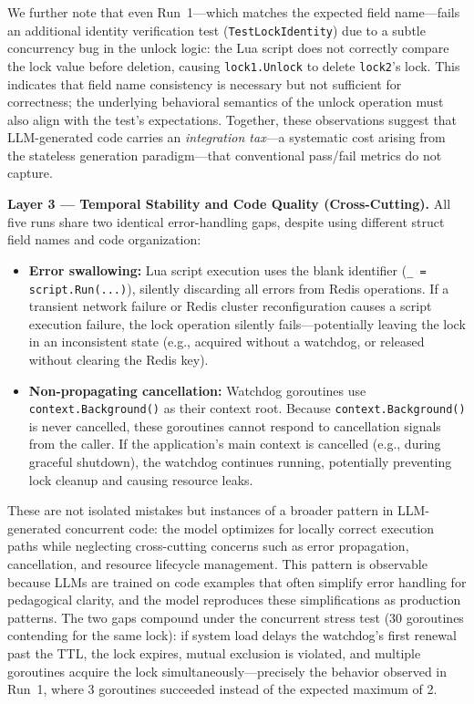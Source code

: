 \documentclass[conference]{IEEEtran}
\begin{document}
We further note that even Run~1---which matches the expected field name---fails an additional identity verification test (\texttt{TestLockIdentity}) due to a subtle concurrency bug in the unlock logic: the Lua script does not correctly compare the lock value before deletion, causing \texttt{lock1.Unlock} to delete \texttt{lock2}'s lock. This indicates that field name consistency is necessary but not sufficient for correctness; the underlying behavioral semantics of the unlock operation must also align with the test's expectations. Together, these observations suggest that LLM-generated code carries an \emph{integration tax}---a systematic cost arising from the stateless generation paradigm---that conventional pass/fail metrics do not capture.

\textbf{Layer 3 --- Temporal Stability and Code Quality (Cross-Cutting).}
All five runs share two identical error-handling gaps, despite using different struct field names and code organization:

\begin{itemize}
  \item \textbf{Error swallowing:} Lua script execution uses the blank identifier (\texttt{\_ = script.Run(...)}), silently discarding all errors from Redis operations. If a transient network failure or Redis cluster reconfiguration causes a script execution failure, the lock operation silently fails---potentially leaving the lock in an inconsistent state (e.g., acquired without a watchdog, or released without clearing the Redis key).
  \item \textbf{Non-propagating cancellation:} Watchdog goroutines use \texttt{context.Background()} as their context root. Because \texttt{context.Background()} is never cancelled, these goroutines cannot respond to cancellation signals from the caller. If the application's main context is cancelled (e.g., during graceful shutdown), the watchdog continues running, potentially preventing lock cleanup and causing resource leaks.
\end{itemize}

These are not isolated mistakes but instances of a broader pattern in LLM-generated concurrent code: the model optimizes for locally correct execution paths while neglecting cross-cutting concerns such as error propagation, cancellation, and resource lifecycle management. This pattern is observable because LLMs are trained on code examples that often simplify error handling for pedagogical clarity, and the model reproduces these simplifications as production patterns. The two gaps compound under the concurrent stress test (30 goroutines contending for the same lock): if system load delays the watchdog's first renewal past the TTL, the lock expires, mutual exclusion is violated, and multiple goroutines acquire the lock simultaneously---precisely the behavior observed in Run~1, where 3 goroutines succeeded instead of the expected maximum of 2.
\end{document}
